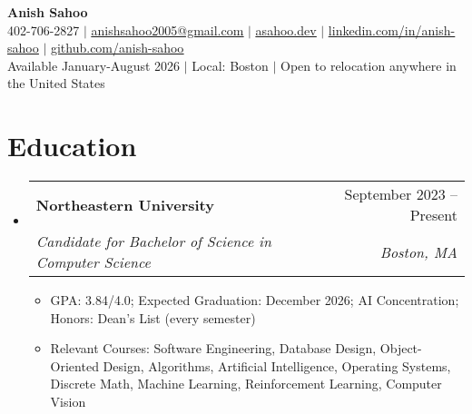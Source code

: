 \documentclass[letterpaper,11pt]{article}
\makeatletter
\newcommand{\resumeItem}[1]{
  \item\small{
    {#1 \vspace{-2pt}}
  }
}
\newcommand{\resumeSubheading}[4]{
  \vspace{-2pt}\item
    \begin{tabular*}{0.97\textwidth}[t]{l@{\extracolsep{\fill}}r}
      \textbf{#1} & #2 \\
      \textit{\small#3} & \textit{\small #4} \\
    \end{tabular*}\vspace{-7pt}
}
\newcommand{\resumeSubHeadingListStart}{\begin{itemize}[leftmargin=0.15in, label={}]}
\newcommand{\resumeSubHeadingListEnd}{\end{itemize}}
\newcommand{\resumeItemListStart}{\begin{itemize}}
\newcommand{\resumeItemListEnd}{\end{itemize}\vspace{-5pt}}
\makeatother
\begin{document}

\begin{center}
    \textbf{\Huge Anish Sahoo} \\ \vspace{1pt}
    \small 402-706-2827 
    $|$ 
    \href{mailto:anishsahoo2005@gmail.com}{\underline{anishsahoo2005@gmail.com}} $|$ 
    \href{https://asahoo.dev}{\underline{asahoo.dev}}
    $|$
    \href{https://linkedin.com/in/anish-sahoo}{\underline{linkedin.com/in/anish-sahoo}} $|$
    \href{https://github.com/anish-sahoo}{\underline{github.com/anish-sahoo}} \vspace{1pt} \\
    Available January-August 2026 $|$ Local: Boston $|$ Open to relocation anywhere in the United States%
\end{center}


\section{Education}
  \resumeSubHeadingListStart
    \resumeSubheading
      {Northeastern University}{September 2023 -- Present}
      {Candidate for Bachelor of Science in Computer Science}{Boston, MA}
    \resumeItemListStart
        \resumeItem{GPA: 3.84/4.0; Expected Graduation: December 2026; AI Concentration; Honors: Dean's List (every semester)}
        \resumeItem{Relevant Courses: Software Engineering, Database Design, Object-Oriented Design, Algorithms, Artificial Intelligence, Operating Systems, Discrete Math, Machine Learning, Reinforcement Learning, Computer Vision}
    \resumeItemListEnd
  \resumeSubHeadingListEnd
\end{document}
